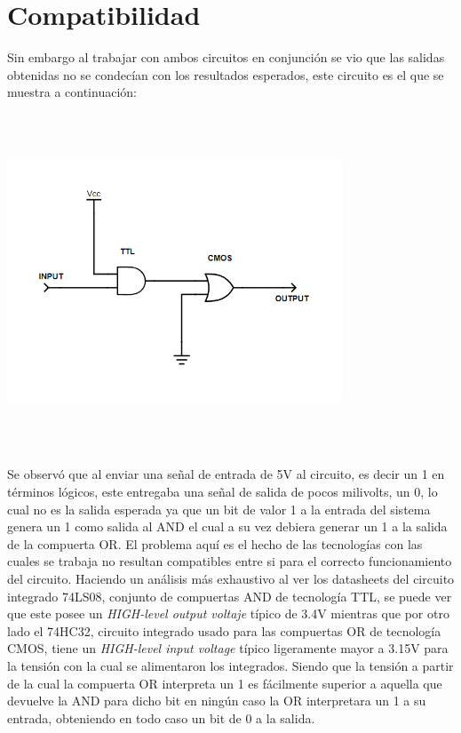 \section{Compatibilidad}
Sin embargo al trabajar con ambos circuitos en conjunción se vio que las salidas obtenidas no se condecían con los resultados esperados, este circuito es el que se muestra a continuación:
\begin{center}
\includegraphics[max height=10cm,max width=10cm,keepaspectratio]{../5-TTL&CMOS/E3-ej5-defectuoso.png}
\end{center}
Se observó que al enviar una señal de entrada de 5V al circuito, es decir un 1 en términos lógicos, este entregaba una señal de salida de pocos milivolts, un 0, lo cual no es la salida esperada ya que un bit de valor 1 a la entrada del sistema genera un 1 como salida al AND el cual a su vez debiera generar un 1 a la salida de la compuerta OR.
El problema aquí es el hecho de las tecnologías con las cuales se trabaja no resultan compatibles entre si para el correcto funcionamiento del circuito. Haciendo un análisis más exhaustivo al ver los datasheets del circuito integrado 74LS08, conjunto de compuertas AND de tecnología TTL, se puede ver que este posee un \textit{HIGH-level output voltaje} típico de 3.4V mientras que por otro lado el 74HC32, circuito integrado usado para las compuertas OR de tecnología CMOS, tiene un \textit{HIGH-level input voltage} típico ligeramente mayor a 3.15V para la tensión con la cual se alimentaron los integrados. Siendo que la tensión a partir de la cual la compuerta OR interpreta un 1 es fácilmente superior a aquella que devuelve la AND para dicho bit en ningún caso la OR interpretara un 1 a su entrada, obteniendo en todo caso un bit de 0 a la salida.
